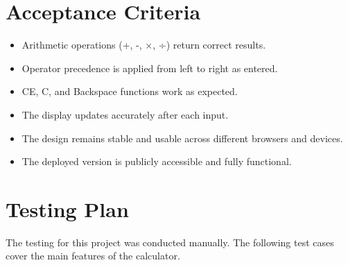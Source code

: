 \documentclass{article}
\begin{document}
\section{Acceptance Criteria}
\begin{itemize}
    \item Arithmetic operations (+, -, ×, ÷) return correct results.
    \item Operator precedence is applied from left to right as entered.
    \item CE, C, and Backspace functions work as expected.
    \item The display updates accurately after each input.
    \item The design remains stable and usable across different browsers and devices.
    \item The deployed version is publicly accessible and fully functional.
\end{itemize}

\section{Testing Plan}
The testing for this project was conducted manually. The following test cases cover the main features of the calculator.
\end{document}
